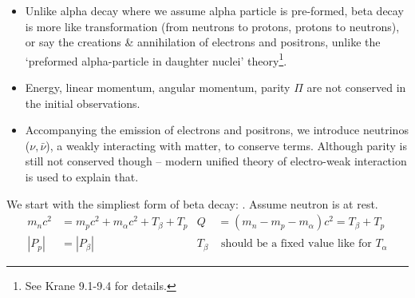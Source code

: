 \documentclass{school-22.101-notes}
\date{November 21, 2011}
\begin{document}
\maketitle

\begin{itemize}
\item Unlike alpha decay where we assume alpha particle is pre-formed, beta decay is more like transformation (from neutrons to protons, protons to neutrons), or say the creations \& annihilation of electrons and positrons, unlike the `preformed alpha-particle in daughter nuclei' theory\footnote{See Krane 9.1-9.4 for details.}. 
\item Energy, linear momentum, angular momentum, parity $\Pi$ are not conserved in the initial observations.
\item Accompanying the emission of electrons and positrons, we introduce neutrinos ($\nu, \bar{\nu}$), a weakly interacting with matter, to conserve terms. Although parity is still not conserved though -- modern unified theory of electro-weak interaction is used to explain that.  
\end{itemize}
We start with the simpliest form of beta decay: . Assume neutron is at rest.
\begin{align}
m_n c^2 &= m_p c^2 + m_{\alpha} c^2 + T_{\beta} + T_p &  Q &= (m_n -m_p - m_{\alpha}) c^2 = T_{\beta} + T_p \\
|P_p| &= |P_{\beta}| & T_{\beta} &\mbox{ should be a fixed value like for }T_{\alpha}
\end{align}
\end{document}

